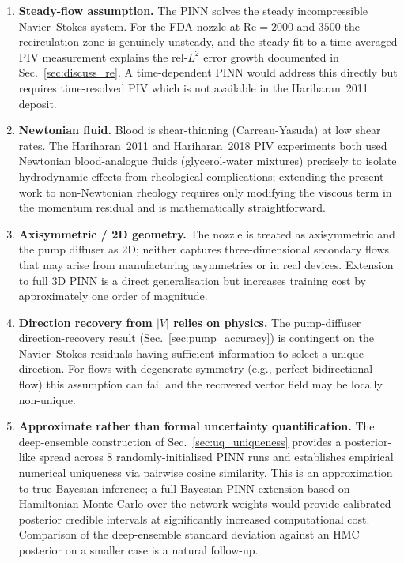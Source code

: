 \documentclass[12pt,a4paper]{article}
\newcommand{\Reyn}{\mathrm{Re}}    %
\begin{document}
\begin{enumerate}[leftmargin=*, itemsep=2pt]
  \item \textbf{Steady-flow assumption.} The PINN solves the
    steady incompressible Navier--Stokes system. For the FDA
    nozzle at $\Reyn = 2000$ and $3500$ the recirculation zone
    is genuinely unsteady, and the steady fit to a time-averaged
    PIV measurement explains the rel-$L^2$ error growth
    documented in Sec.~\ref{sec:discuss_re}. A time-dependent
    PINN \cite{Raissi2020HFM} would address this directly but
    requires time-resolved PIV which is not available in the
    Hariharan~2011 deposit.
  \item \textbf{Newtonian fluid.} Blood is shear-thinning
    (Carreau-Yasuda) at low shear rates. The Hariharan~2011 and
    Hariharan~2018 PIV experiments both used Newtonian
    blood-analogue fluids (glycerol-water mixtures) precisely to
    isolate hydrodynamic effects from rheological complications;
    extending the present work to non-Newtonian rheology requires
    only modifying the viscous term in the momentum residual and
    is mathematically straightforward.
  \item \textbf{Axisymmetric / 2D geometry.} The nozzle is
    treated as axisymmetric and the pump diffuser as 2D; neither
    captures three-dimensional secondary flows that may arise
    from manufacturing asymmetries or in real devices. Extension
    to full 3D PINN is a direct generalisation but increases
    training cost by approximately one order of magnitude.
  \item \textbf{Direction recovery from $|V|$ relies on physics.}
    The pump-diffuser direction-recovery result
    (Sec.~\ref{sec:pump_accuracy}) is contingent on the
    Navier--Stokes residuals having sufficient information to
    select a unique direction. For flows with degenerate symmetry
    (e.g., perfect bidirectional flow) this assumption can fail
    and the recovered vector field may be locally non-unique.
  \item \textbf{Approximate rather than formal uncertainty
    quantification.} The deep-ensemble construction of
    Sec.~\ref{sec:uq_uniqueness} provides a posterior-like
    spread across $8$ randomly-initialised PINN runs and
    establishes empirical numerical uniqueness via pairwise
    cosine similarity. This is an approximation to true
    Bayesian inference; a full Bayesian-PINN extension
    \cite{Yang2021BayesPINN} based on Hamiltonian Monte Carlo
    over the network weights would provide calibrated
    posterior credible intervals at significantly increased
    computational cost. Comparison of the deep-ensemble
    standard deviation against an HMC posterior on a smaller
    case is a natural follow-up.
\end{enumerate}
\end{document}
